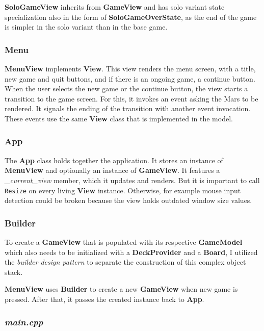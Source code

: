 \textbf{SoloGameView} inherits from \textbf{GameView} and has solo variant state specialization also in the form of \textbf{SoloGameOverState}, as the end of the game is simpler in the solo variant than in the base game.

\subsubsection*{Menu}

\textbf{MenuView} implements \textbf{View}. This view renders the menu screen, with a title, new game and quit buttons, and if there is an ongoing game, a continue button. When the user selects the new game or the continue button, the view starts a transition to the game screen. For this, it invokes an event asking the Mars to be rendered. It signals the ending of the transition with another event invocation. These events use the same \textbf{View} class that is implemented in the model.

\subsubsection*{App}

The \textbf{App} class holds together the application. It stores an instance of \textbf{MenuView} and optionally an instance of \textbf{GameView}. It features a \textit{\_current\_view} member, which it updates and renders. But it is important to call \texttt{Resize} on every living \textbf{View} instance. Otherwise, for example mouse input detection could be broken because the view holds outdated window size values.

\subsubsection*{Builder}

To create a \textbf{GameView} that is populated with its respective \textbf{GameModel} which also needs to be initialized with a \textbf{DeckProvider} and a \textbf{Board}, I utilized the \textit{builder design pattern}\cite{gamma1994design} to separate the construction of this complex object stack.

\textbf{MenuView} uses \textbf{Builder} to create a new \textbf{GameView} when new game is pressed. After that, it passes the created instance back to \textbf{App}.

\subsubsection*{\textit{main.cpp}}


